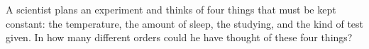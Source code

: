 A scientist plans an experiment and thinks of four things that must be kept constant: the temperature, the amount of sleep, the studying, and the kind of test given. In how many different orders could he have thought of these four things?
